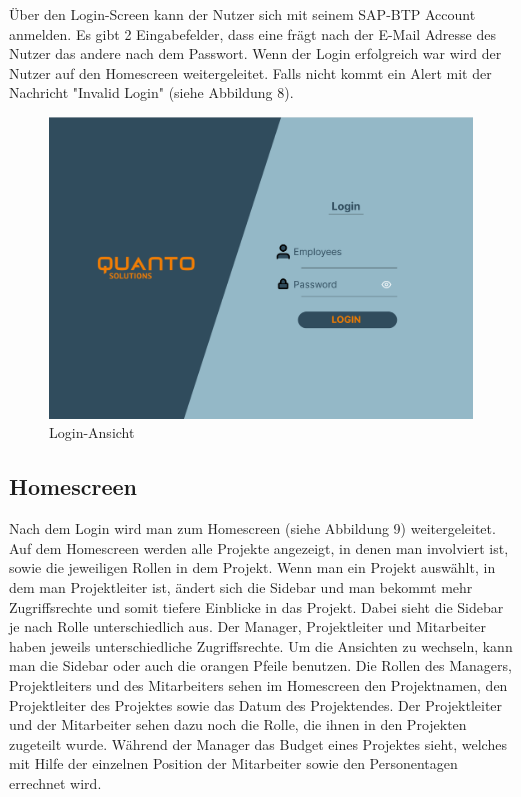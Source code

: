 \documentclass{article}
\begin{document}
Über den Login-Screen kann der Nutzer sich mit seinem SAP-BTP Account anmelden. Es gibt 2 Eingabefelder, dass eine frägt nach der E-Mail Adresse des Nutzer das andere nach dem Passwort.
Wenn der Login erfolgreich war wird der Nutzer auf den Homescreen weitergeleitet. Falls nicht kommt ein Alert mit der Nachricht "Invalid Login" (siehe Abbildung 8).

\begin{figure}[h]
    \includegraphics[height= 0.5\textwidth,width= \textwidth]{images/Login.png}
    \caption{Login-Ansicht}
    \label{fig:beispiel}
\end{figure}

\subsection{Homescreen}
Nach dem Login wird man zum Homescreen (siehe Abbildung 9) weitergeleitet. Auf
dem Homescreen werden alle Projekte angezeigt, in denen man involviert ist,
sowie die jeweiligen Rollen in dem Projekt. Wenn man ein Projekt auswählt, in
dem man Projektleiter ist, ändert sich die Sidebar und man bekommt mehr
Zugriffsrechte und somit tiefere Einblicke in das Projekt. Dabei sieht die
Sidebar je nach Rolle unterschiedlich aus. Der Manager, Projektleiter und
Mitarbeiter haben jeweils unterschiedliche Zugriffsrechte. Um die Ansichten zu
wechseln, kann man die Sidebar oder auch die orangen Pfeile benutzen. Die
Rollen des Managers, Projektleiters und des Mitarbeiters sehen im Homescreen
den Projektnamen, den Projektleiter des Projektes sowie das Datum des
Projektendes. Der Projektleiter und der Mitarbeiter sehen dazu noch die Rolle,
die ihnen in den Projekten zugeteilt wurde. Während der Manager das Budget
eines Projektes sieht, welches mit Hilfe der einzelnen Position der Mitarbeiter
sowie den Personentagen errechnet wird.
\end{document}
